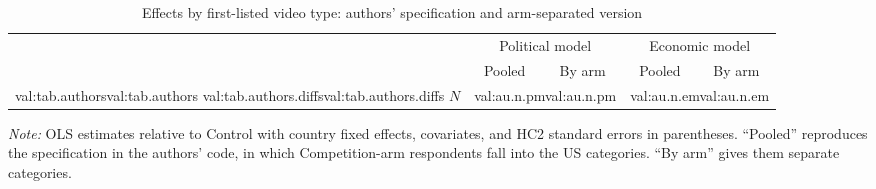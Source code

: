 \documentclass[11pt]{article}
\newcommand{\tablenote}[1]{\par\vspace{4pt}\begin{minipage}{\linewidth}\footnotesize #1\end{minipage}}
\newcommand{\val}[1]{\ifcsname val:#1\endcsname\else\errmessage{Undefined value: #1}\fi\csname val:#1\endcsname}
\begin{document}
\begin{table}[H]
\centering
\caption{Effects by first-listed video type: authors' specification and arm-separated version}
\label{tab:authors}
\begin{tabular}{lcccc}
\toprule
 & \multicolumn{2}{c}{Political model} & \multicolumn{2}{c}{Economic model} \\
\cmidrule(lr){2-3}\cmidrule(lr){4-5}
 & Pooled & By arm & Pooled & By arm \\
\midrule
\val{tab.authors}
\midrule
\val{tab.authors.diffs}
\midrule
$N$ & \multicolumn{2}{c}{\val{au.n.pm}} & \multicolumn{2}{c}{\val{au.n.em}} \\
\bottomrule
\end{tabular}
\tablenote{\emph{Note:} OLS estimates relative to Control with country fixed effects, covariates, and HC2 standard errors in parentheses. ``Pooled'' reproduces the specification in the authors' code, in which Competition-arm respondents fall into the US categories. ``By arm'' gives them separate categories.}
\end{table}
\end{document}
